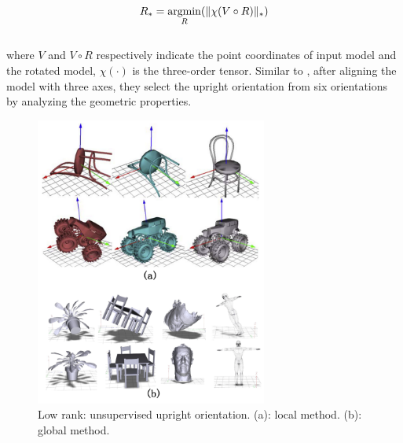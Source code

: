 \small{
\begin{equation}
 \label{eq:UprightJin}
 R_{*}=\mathop{\operatorname*{argmin}}_{R}(\|\chi(V\circ R)\|_{*})
\end{equation}
}
\\
where $V$ and $V\circ R$ respectively indicate the point coordinates of input model and the rotated model, $\chi(\cdot)$ is the three-order tensor. Similar to \cite{jin2012unsupervised}, after aligning the model with three axes, they select the upright orientation from six orientations by analyzing the geometric properties.
%

\begin{figure}[ht]
  \centering
  \includegraphics[width=3in]{images/upright_lowrank}
  \caption{Low rank: unsupervised upright orientation. (a): local method\cite{jin2012unsupervised}. (b): global method\cite{wang2014upright}.}
\end{figure} 